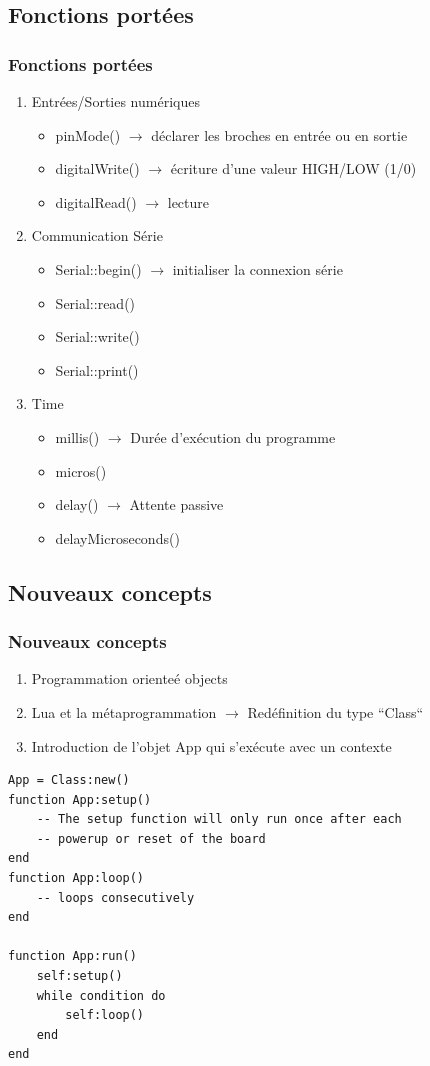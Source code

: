 \documentclass{beamer}
\begin{document}
\subsection{Fonctions portées}
\begin{frame}
\frametitle{Fonctions portées}
\begin{enumerate}
 \item Entrées/Sorties numériques
\begin{itemize}
\item pinMode() $\to$ déclarer les broches en entrée ou en sortie
\item digitalWrite() $\to$ écriture d'une valeur HIGH/LOW (1/0)
\item digitalRead() $\to$ lecture
\end{itemize}
\item Communication Série
\begin{itemize}
\item Serial::begin() $\to$ initialiser la connexion série
\item Serial::read()
\item Serial::write()
\item Serial::print()
\end{itemize}
\item Time
\begin{itemize}
\item millis()  $\to$ Durée d'exécution du programme
\item micros()
\item delay()  $\to$ Attente passive
\item delayMicroseconds()
\end{itemize}
\end{enumerate}
\end{frame}

\subsection{Nouveaux concepts}
\begin{frame}[containsverbatim]
\frametitle{Nouveaux concepts}
\begin{enumerate}
 \item Programmation orienteé objects
 \item Lua et la métaprogrammation $\to$ Redéfinition du type ``Class``
 \item Introduction de l'objet App qui s'exécute avec un contexte
\end{enumerate}

\scriptsize{\begin{lstlisting}
App = Class:new()
function App:setup()
    -- The setup function will only run once after each
    -- powerup or reset of the board
end
function App:loop()
    -- loops consecutively
end

function App:run()
    self:setup()
    while condition do
        self:loop()
    end
end
\end{lstlisting}}

\end{frame}
\end{document}
